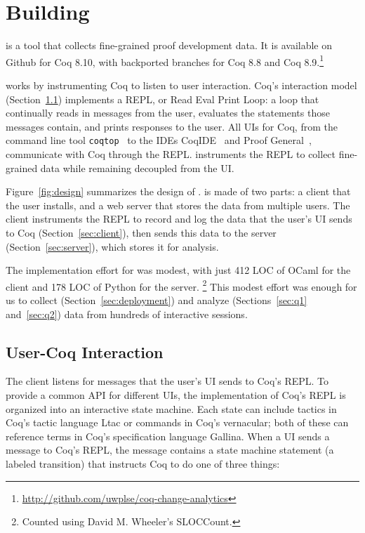 \section{Building \toolname}
\label{sec:plugin}

\toolname is a tool that collects fine-grained proof development data.
It is available on Github for Coq 8.10, with backported branches for
Coq 8.8 and Coq 8.9.\footnote{\url{http://github.com/uwplse/coq-change-analytics}}

\toolname works by instrumenting Coq to listen to user interaction.
Coq's interaction model (Section~\ref{sec:repl}) implements a REPL,
or Read Eval Print Loop: a loop that continually reads in messages
from the user, evaluates the statements those messages contain, 
and prints responses to the user.
All UIs for Coq, from the command line tool
\lstinline{coqtop}~\cite{coq-commands} to the IDEs CoqIDE~\cite{coqide} and
Proof General~\cite{Aspinall2000}, communicate with Coq through the REPL.
\toolname instruments the REPL to collect fine-grained data while remaining
decoupled from the UI.

Figure~\ref{fig:design} summarizes the design of \toolname.
\toolname is made of two parts: a client that the user installs,
and a web server that stores the data from multiple users.
The client instruments the REPL to record and log the data that the
user's UI sends to Coq (Section~\ref{sec:client}),
then sends this data to the server (Section~\ref{sec:server}),
which stores it for analysis.

The implementation effort for \toolname was modest, with just 412 LOC
of OCaml for the client and 178 LOC of Python for the server.%
\footnote{Counted using David M. Wheeler's SLOCCount.}
This modest effort was enough for us to collect 
(Section~\ref{sec:deployment}) and analyze 
(Sections~\ref{sec:q1} and~\ref{sec:q2}) data from hundreds
of interactive sessions.

\subsection{User-Coq Interaction}
\label{sec:repl}

The \toolname client listens for messages that the user's UI
sends to Coq's REPL.
To provide a common API for different UIs, the implementation of
Coq's REPL is organized into an interactive state machine.
Each state can include tactics in Coq's tactic language Ltac or commands
in Coq's vernacular; both of these can reference terms in Coq's
specification language Gallina.
When a UI sends a message to Coq's REPL, the message contains a state
machine statement (a labeled transition) that instructs Coq to do one of three things:

